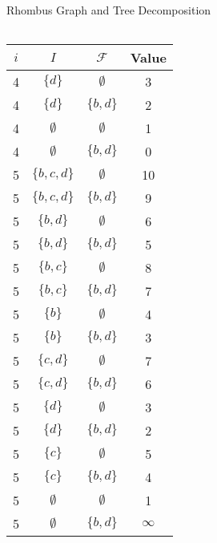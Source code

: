 \documentclass{beamer}
\begin{document}
\begin{frame}{Rhombus Graph and Tree Decomposition}
\begin{minipage}{0.35\textwidth}
\begin{tabular}{|c| >{\small}c | >{\small}c | >{\small}c |}
    \hline
    \end{tabular}
  \end{minipage}
  \begin{minipage}{0.1\textwidth}
    \renewcommand{\arraystretch}{0.5} 
    \setlength{\tabcolsep}{0.7pt} 
    \begin{tabular}{|c| >{\small}c | >{\small}c | >{\small}c |}
    \hline
    \textbf{\(i\)} & \textbf{\(I\)} & \textbf{\(\mathcal{F}\)} & \textbf{Value} \\
    \hline
    4 & \( \{ d \} \) & \( \emptyset \) & 3 \\
    4 & \( \{ d \} \) & \( \{ b, d \} \) & 2 \\
    4 & \( \emptyset \) & \( \emptyset \) & 1 \\
    4 & \( \emptyset \) & \( \{ b, d \} \) & 0 \\
    \hline
    5 & \( \{ b, c, d \} \) & \( \emptyset \) & 10 \\
    5 & \( \{ b, c, d \} \) & \( \{ b,d \} \) & 9 \\
    5 & \( \{ b, d \} \) & \( \emptyset \) & 6 \\
    5 & \( \{ b, d \} \) & \( \{ b, d \} \) & 5 \\
    5 & \( \{ b, c \} \) & \( \emptyset \) & 8 \\
    5 & \( \{ b, c \} \) & \( \{ b, d \} \) & 7 \\
    5 & \( \{ b \} \) & \( \emptyset \) & 4 \\
    5 & \( \{ b \} \) & \( \{ b, d \} \) & 3 \\
    5 & \( \{ c, d \} \) & \( \emptyset \) & 7 \\
    5 & \( \{ c, d \} \) & \( \{ b, d \} \) & 6 \\
    5 & \( \{ d \} \) & \( \emptyset \) & 3 \\
    5 & \( \{ d \} \) & \( \{ b, d \} \) & 2 \\
    5 & \( \{ c \} \) & \( \emptyset \) & 5 \\
    5 & \( \{ c \} \) & \( \{ b, d \} \) & 4 \\
    5 & \( \emptyset \) & \( \emptyset \) & 1 \\
    5 & \( \emptyset \) & \( \{ b, d \} \) & \( \infty \) \\
    \hline
    \end{tabular}
  \end{minipage}
\end{frame}
\end{document}
